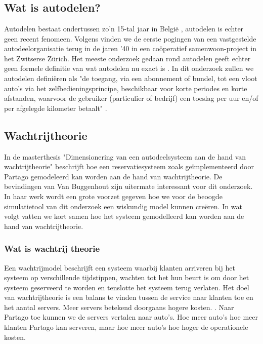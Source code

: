 \chapter{}
\label{ch:stand-van-zaken}



\section{Wat is autodelen?}
Autodelen bestaat ondertussen zo'n 15-tal jaar in België \autocite{ing}, autodelen is echter geen recent fenomeen. Volgens \textcite{millardball} vinden we de eerste pogingen van een vastgestelde autodeelorganisatie terug in de jaren '40 in een coöperatief samenwoon-project in het Zwitserse Zürich. Het meeste onderzoek gedaan rond autodelen geeft echter geen formele definitie van wat autodelen nu exact is \autocite{millardball}. In dit onderzoek zullen we autodelen definiëren als "de toegang, via een abonnement of bundel, tot een vloot auto's via het zelfbedieningsprincipe, beschikbaar voor korte periodes en korte afstanden, waarvoor de gebruiker (particulier of bedrijf) een toeslag per uur en/of per afgelegde kilometer betaalt" \autocite{ing}.

\section{Wachtrijtheorie}
In de masterthesis "Dimensionering van een autodeelsysteem aan de hand van wachtrijtheorie" beschrijft \textcite{van-buggenhout} hoe een reservatiesysteem zoals geïmplementeerd door Partago gemodeleerd kan worden aan de hand van wachtrijtheorie. De bevindingen van Van Buggenhout zijn uitermate interessant voor dit onderzoek. In haar werk wordt een grote voorzet gegeven hoe we voor de beoogde simulatietool van dit onderzoek een wiskundig model kunnen creëren. In wat volgt vatten we kort samen hoe het systeem gemodelleerd kan worden aan de hand van wachtrijtheorie.

\subsection{Wat is wachtrij theorie}
Een wachtrijmodel beschrijft een systeem waarbij klanten arriveren bij het systeem op verschillende tijdstippen, wachten tot het hun beurt is om door het systeem geserveerd te worden en tenslotte het systeem terug verlaten. Het doel van wachtrijtheorie is een balans te vinden tussen de service naar klanten toe en het aantal servers. Meer servers betekend doorgaans hogere kosten. \textcite{van-buggenhout}. Naar Partago toe kunnen we de servers vertalen naar auto's. Hoe meer auto's hoe meer klanten Partago kan serveren, maar hoe meer auto's hoe hoger de operationele kosten. 


